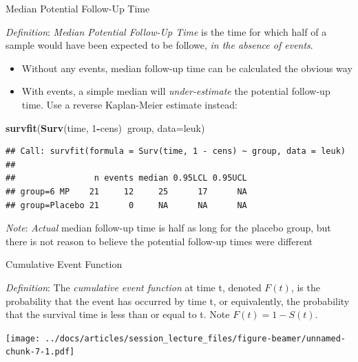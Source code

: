\documentclass[
  ignorenonframetext,
]{beamer}
\newenvironment{Shaded}{\begin{snugshade}}{\end{snugshade}}
\newcommand{\DataTypeTok}[1]{\textcolor[rgb]{0.13,0.29,0.53}{#1}}
\newcommand{\DecValTok}[1]{\textcolor[rgb]{0.00,0.00,0.81}{#1}}
\newcommand{\KeywordTok}[1]{\textcolor[rgb]{0.13,0.29,0.53}{\textbf{#1}}}
\newcommand{\NormalTok}[1]{#1}
\newcommand{\OperatorTok}[1]{\textcolor[rgb]{0.81,0.36,0.00}{\textbf{#1}}}
\providecommand{\tightlist}{%
  \setlength{\itemsep}{0pt}\setlength{\parskip}{0pt}}
\begin{document}
\begin{frame}[fragile]{Median Potential Follow-Up Time}
\protect\hypertarget{median-potential-follow-up-time}{}

\emph{Definition}: \emph{Median Potential Follow-Up Time} is the time
for which half of a sample would have been expected to be followe,
\emph{in the absence of events}.

\begin{itemize}
\tightlist
\item
  Without any events, median follow-up time can be calculated the
  obvious way
\item
  With events, a simple median will \emph{under-estimate} the potential
  follow-up time. Use a reverse Kaplan-Meier estimate instead:
\end{itemize}

\footnotesize

\begin{Shaded}
\begin{Highlighting}[]
\KeywordTok{survfit}\NormalTok{(}\KeywordTok{Surv}\NormalTok{(time, }\DecValTok{1}\OperatorTok{-}\NormalTok{cens)}\OperatorTok{~}\NormalTok{group, }\DataTypeTok{data=}\NormalTok{leuk)}
\end{Highlighting}
\end{Shaded}

\begin{verbatim}
## Call: survfit(formula = Surv(time, 1 - cens) ~ group, data = leuk)
## 
##                n events median 0.95LCL 0.95UCL
## group=6 MP    21     12     25      17      NA
## group=Placebo 21      0     NA      NA      NA
\end{verbatim}

\emph{Note}: \emph{Actual} median follow-up time is half as long for the
placebo group, but there is not reason to believe the potential
follow-up times were different

\end{frame}

\begin{frame}{Cumulative Event Function}
\protect\hypertarget{cumulative-event-function}{}

\emph{Definition}: The \emph{cumulative event function} at time t,
denoted \(F(t)\), is the probability that the event has occurred by time
t, or equivalently, the probability that the survival time is less than
or equal to t. Note \(F(t) = 1-S(t)\).

\texttt{[image: ../docs/articles/session\_lecture\_files/figure-beamer/unnamed-chunk-7-1.pdf]}

\end{frame}
\end{document}
